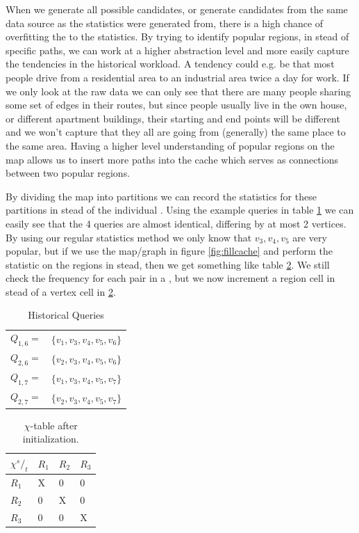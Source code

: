 

When we generate all possible \spath candidates, or generate \spath candidates from the same data source as the statistics were generated from, there is a high chance of overfitting the \spaths to the statistics. By trying to identify popular regions, in stead of specific paths, we can work at a higher abstraction level and more easily capture the tendencies in the historical workload. A tendency could e.g. be that most people drive from a residential area to an industrial area twice a day for work. If we only look at the raw data we can only see that there are many people sharing some set of edges in their routes, but since people usually live in the own house, or different apartment buildings, their starting and end points will be different and we won't capture that they all are going from (generally) the same place to the same area. Having a higher level understanding of popular regions on the map allows us to insert more paths into the cache which serves as connections between two popular regions.

By dividing the map into partitions we can record the statistics for these partitions in stead of the individual \spathsns. Using the example queries in table \ref{tab:queries2} we can easily see that the 4 queries are almost identical, differing by at most 2 vertices. By using our regular statistics method we only know that $v_3,v_4,v_5$ are very popular, but if we use the map/graph in figure \ref{fig:fillcache} and perform the statistic on the regions in stead, then we get something like table \ref{tab:rchitable}. We still check the frequency for each pair in a \spathns, but we now increment a region cell in stead of a vertex cell in \ref{tab:rchitable}.


\begin{table}
\center
\begin{tabular}{l l}
$Q_{1,6} =$ 	& $\{v_1,v_3,v_4,v_5,v_6\}$\\
$Q_{2,6} =$ 	& $\{v_2,v_3,v_4,v_5,v_6\}$ \\
$Q_{1,7} =$ 	& $\{v_1,v_3,v_4,v_5,v_7\}$ \\
$Q_{2,7} =$ 	& $\{v_2,v_3,v_4,v_5,v_7\}$ \\
\end{tabular}
\caption{Historical Queries}
\label{tab:queries2}
\end{table}

\begin{table}
\center
\begin{tabular}{|l||l|l|l|}
\textbf{$\chi {^s/_t}$}	& $R_1$		& $R_2$		& $R_3$	\\\hline
$R_1$			& X		& 0		& 0	 \\
$R_2$			& 0		& X		& 0	 \\
$R_3$			& 0		& 0		& X	 \\
\end{tabular}
\caption{$\chi$-table after initialization.}
\label{tab:rchitable}
\end{table}

